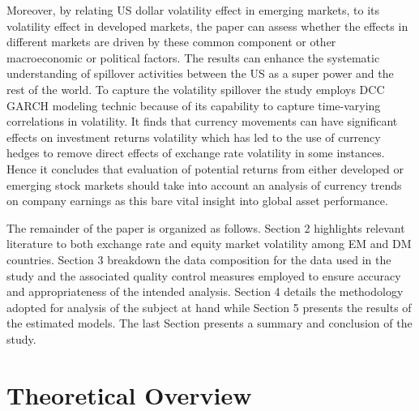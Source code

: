\documentclass[11pt,preprint, authoryear]{elsarticle}
\numberwithin{equation}{section}
\numberwithin{figure}{section}
\numberwithin{table}{section}
\begin{document}
Moreover, by relating US dollar volatility effect in emerging markets,
to its volatility effect in developed markets, the paper can assess
whether the effects in different markets are driven by these common
component or other macroeconomic or political factors. The results can
enhance the systematic understanding of spillover activities between the
US as a super power and the rest of the world. To capture the volatility
spillover the study employs DCC GARCH modeling technic because of its
capability to capture time-varying correlations in volatility. It finds
that currency movements can have significant effects on investment
returns volatility which has led to the use of currency hedges to remove
direct effects of exchange rate volatility in some instances. Hence it
concludes that evaluation of potential returns from either developed or
emerging stock markets should take into account an analysis of currency
trends on company earnings as this bare vital insight into global asset
performance.

The remainder of the paper is organized as follows. Section 2 highlights
relevant literature to both exchange rate and equity market volatility
among EM and DM countries. Section 3 breakdown the data composition for
the data used in the study and the associated quality control measures
employed to ensure accuracy and appropriateness of the intended
analysis. Section 4 details the methodology adopted for analysis of the
subject at hand while Section 5 presents the results of the estimated
models. The last Section presents a summary and conclusion of the study.

\hypertarget{theoretical-overview}{%
\section{\texorpdfstring{Theoretical Overview
\label{Theorectical Overview}}{Theoretical Overview }}\label{theoretical-overview}}
\end{document}
